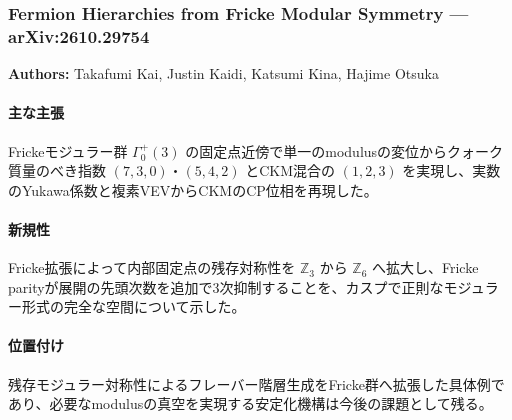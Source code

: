 \subsubsection{Fermion Hierarchies from Fricke Modular Symmetry --- arXiv:2610.29754}

\textbf{Authors:} Takafumi Kai, Justin Kaidi, Katsumi Kina, Hajime Otsuka

\paragraph{主な主張}
Frickeモジュラー群 $\Gamma_0^+(3)$ の固定点近傍で単一のmodulusの変位からクォーク質量のべき指数 $(7,3,0)$・$(5,4,2)$ とCKM混合の $(1,2,3)$ を実現し、実数のYukawa係数と複素VEVからCKMのCP位相を再現した\cite{Kai:2026Fricke}。

\paragraph{新規性}
Fricke拡張によって内部固定点の残存対称性を $\mathbb{Z}_3$ から $\mathbb{Z}_6$ へ拡大し、Fricke parityが展開の先頭次数を追加で3次抑制することを、カスプで正則なモジュラー形式の完全な空間について示した。

\paragraph{位置付け}
残存モジュラー対称性によるフレーバー階層生成をFricke群へ拡張した具体例であり、必要なmodulusの真空を実現する安定化機構は今後の課題として残る。
